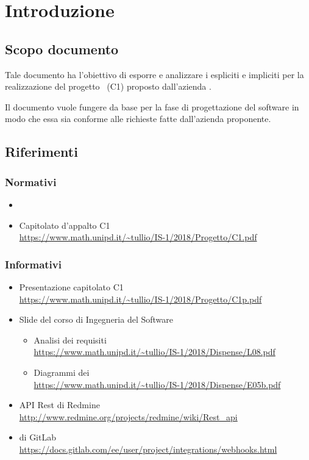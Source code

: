 \newpage
\section{Introduzione}

	\subsection{Scopo documento}
	Tale documento ha l'obiettivo di esporre e analizzare i  espliciti e impliciti per la realizzazione del progetto \progetto\ (C1) proposto dall'azienda \II.

	Il documento vuole fungere da base per la fase di progettazione del software in modo che essa sia conforme alle richieste fatte dall'azienda proponente.

    

    

	\subsection{Riferimenti}

	\subsubsection{Normativi}
	\begin{itemize}
		\item \Doc{\NdPv}
		\item Capitolato d'appalto C1\\
		\url{https://www.math.unipd.it/~tullio/IS-1/2018/Progetto/C1.pdf}
	\end{itemize}

	\subsubsection{Informativi} \label{sec:RiferimentiInformativi}
	\begin{itemize}
		\item Presentazione capitolato C1\\
		\url{https://www.math.unipd.it/~tullio/IS-1/2018/Progetto/C1p.pdf}
		\item Slide del corso di Ingegneria del Software
		\begin{itemize}
			\item Analisi dei requisiti\\
			\url{https://www.math.unipd.it/~tullio/IS-1/2018/Dispense/L08.pdf}
			\item Diagrammi dei \\
			\url{https://www.math.unipd.it/~tullio/IS-1/2018/Dispense/E05b.pdf}
		\end{itemize}
		\item API Rest di Redmine\\
		\url{http://www.redmine.org/projects/redmine/wiki/Rest_api}
		\item {} di GitLab\\
		\url{https://docs.gitlab.com/ee/user/project/integrations/webhooks.html}
	\end{itemize}